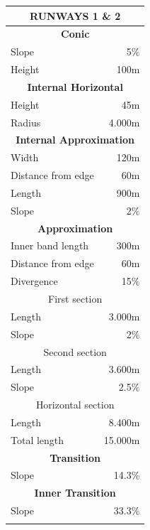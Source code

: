 	\begin{longtable}[htb]{@{}lr@{}}
		\toprule[3pt]
		\multicolumn{2}{c}{\textbf{\large RUNWAYS 1 \& 2  } }\\ \midrule[2pt]
		\multicolumn{2}{c}{\textbf{Conic} }\\
		\midrule[0.5pt]
		Slope & 5\%\\
		Height & 100m\\
		\midrule[2pt]
		\multicolumn{2}{c}{\textbf{Internal Horizontal} }\\
		\midrule[0.5pt]
		Height & 45m\\
		Radius & 4.000m\\
		\midrule[2pt]
		\multicolumn{2}{c}{\textbf{Internal Approximation} }\\
		\midrule[0.5pt]
		Width & 120m\\
		Distance from edge & 60m\\
		Length & 900m\\
		Slope & 2\% \\
		\midrule[2pt]
		\multicolumn{2}{c}{\textbf{Approximation} }\\
		\midrule[0.5pt]
		Inner band length & 300m\\
		Distance from edge & 60m\\
		Divergence & 15\% \\
		\midrule[0.5pt]
		\multicolumn{2}{c}{First section} \\
		\midrule[0.5pt]
		Length & 3.000m\\
		Slope & 2\%\\
		\midrule[0.5pt]
		\multicolumn{2}{c}{Second section} \\
		\midrule[0.5pt]
		Length & 3.600m\\
		Slope & 2.5\%\\
		\midrule[0.5pt]
		\multicolumn{2}{c}{Horizontal section} \\
		\midrule[0.5pt]
		Length & 8.400m\\
		Total length & 15.000m\\
		\midrule[2pt]
		\multicolumn{2}{c}{\textbf{Transition} }\\
		\midrule[0.5pt]
		Slope & 14.3\%\\
		\midrule[2pt]
		\multicolumn{2}{c}{\textbf{Inner Transition} }\\
		\midrule[0.5pt]
		Slope & 33.3\%\\
		\midrule[2pt]
		\vspace{5cm}&\vspace{5cm}\\

\end{longtable}
